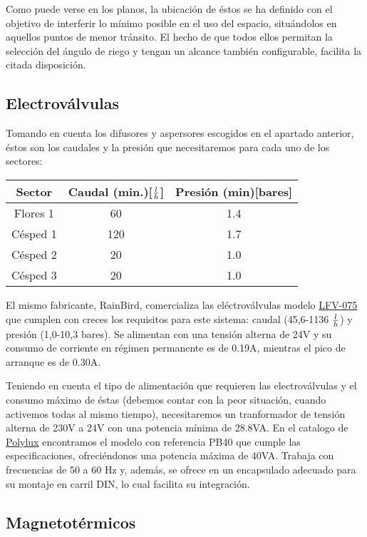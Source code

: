 Como puede verse en los planos, la ubicaci\'on de \'estos se ha definido con el objetivo de interferir lo m\'inimo posible en el uso del espacio, situ\'andolos en aquellos puntos de menor tr\'ansito. El hecho de que todos ellos permitan la selecci\'on del \'angulo de riego y tengan un alcance tambi\'en configurable, facilita la citada disposici\'on.

\subsection{Electrov\'alvulas}

Tomando en cuenta los difusores y aspersores escogidos en el apartado anterior, \'estos son los caudales y la presi\'on que necesitaremos para cada uno de los sectores:

\begin{center}
\begin{tabular}{c|c|c}
 Sector&Caudal (min.)[$l \over h$]&Presi\'on (min)[bares]\\
 \hline
 Flores 1&60&1.4 \\
 Césped 1&120&1.7 \\
 Césped 2&20&1.0 \\
 Césped 3&20&1.0 \\
\end{tabular}
\end{center}

El mismo fabricante, RainBird, comercializa las el\'ectrov\'alvulas modelo \hyperref[LFV]{LFV-075} que cumplen con creces los requisitos para este sistema: caudal (45,6-1136 $l \over h$) y presi\'on (1,0-10,3 bares). Se alimentan con una tensi\'on alterna de 24V y su consumo de corriente en r\'egimen permanente es de 0.19A, mientras el pico de arranque es de 0.30A.

Teniendo en cuenta el tipo de alimentaci\'on que requieren las electrov\'alvulas y el consumo m\'aximo de \'estas (debemos contar con la peor situaci\'on, cuando activemos todas al mismo tiempo), necesitaremos un tranformador de tensi\'on alterna de 230V a 24V con una potencia m\'inima de 28.8VA. En el catalogo de \hyperref[Polylux]{Polylux} encontramos el modelo con referencia PB40 que cumple las especificaciones, ofreci\'endonos una potencia m\'axima de 40VA. Trabaja con frecuencias de 50 a 60 Hz y, adem\'as, se ofrece en un encapsulado adecuado para su montaje en carril DIN, lo cual facilita su integraci\'on.

\subsection{Magnetot\'ermicos}

